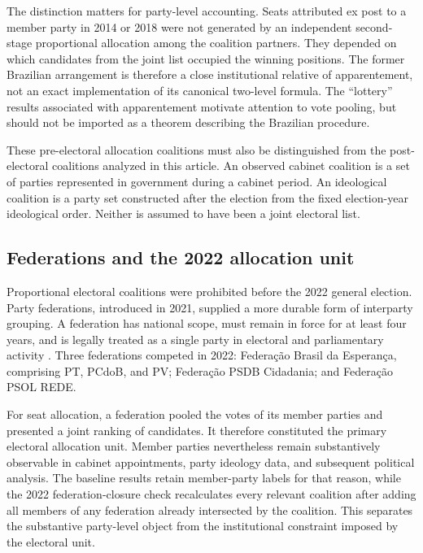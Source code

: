 \documentclass[11pt]{article}
\begin{document}
The distinction matters for party-level accounting. Seats attributed ex post
to a member party in 2014 or 2018 were not generated by an independent
second-stage proportional allocation among the coalition partners. They
depended on which candidates from the joint list occupied the winning
positions. The former Brazilian arrangement is therefore a close
institutional relative of apparentement, not an exact implementation of its
canonical two-level formula. The ``lottery'' results associated with
apparentement motivate attention to vote pooling, but should not be imported
as a theorem describing the Brazilian procedure.

These pre-electoral allocation coalitions must also be distinguished from
the post-electoral coalitions analyzed in this article. An observed cabinet
coalition is a set of parties represented in government during a cabinet
period. An ideological coalition is a party set constructed after the election
from the fixed election-year ideological order. Neither is assumed to have
been a joint electoral list.

\subsection{Federations and the 2022 allocation unit}

Proportional electoral coalitions were prohibited before the 2022 general
election. Party federations, introduced in 2021, supplied a more durable
form of interparty grouping. A federation has national scope, must remain
in force for at least four years, and is legally treated as a single party in
electoral and parliamentary activity
\parencite{tse2022federacoes}. Three federations competed in 2022:
Federação Brasil da Esperança, comprising PT, PCdoB, and PV; Federação
PSDB Cidadania; and Federação PSOL REDE.

For seat allocation, a federation pooled the votes of its member parties and
presented a joint ranking of candidates. It therefore constituted the primary
electoral allocation unit. Member parties nevertheless remain substantively
observable in cabinet appointments, party ideology data, and subsequent
political analysis. The baseline results retain member-party labels for that
reason, while the 2022 federation-closure check recalculates every relevant
coalition after adding all members of any federation already intersected by
the coalition. This separates the substantive party-level object from the
institutional constraint imposed by the electoral unit.
\end{document}
